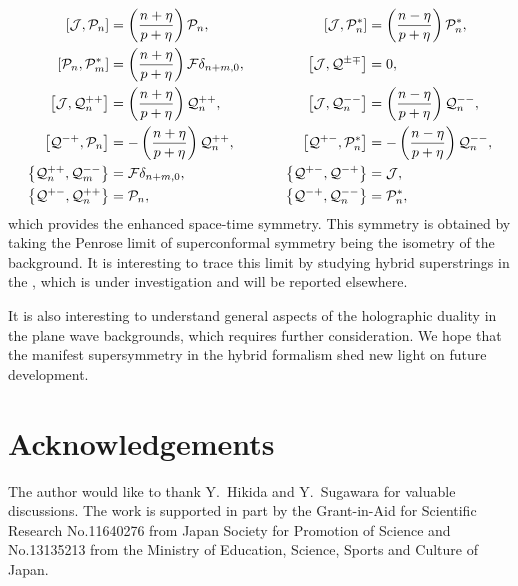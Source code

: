 \documentclass[a4paper,seceq,preprint]{ptptex}
\begin{document}
\begin{alignat}{2}
\left[{\cal J},{\cal P}_n\right]
&=\left(\frac{n+\eta}{p+\eta}\right){\cal P}_n,&\qquad
\left[{\cal J},{\cal P}^*_n\right]
&=\left(\frac{n-\eta}{p+\eta}\right){\cal P}^*_n,\nonumber\\
 \left[{\cal P}_n,{\cal P}^*_m\right]
&=\left(\frac{n+\eta}{p+\eta}\right){\cal F}\delta_{n+m,0},&\qquad
\left[{\cal J},{\cal Q}^{\pm\mp}\right]&=0,
\nonumber\\
\left[{\cal J},{\cal Q}^{++}_n\right]
&=\left(\frac{n+\eta}{p+\eta}\right){\cal Q}^{++}_n,&\qquad
\left[{\cal J},{\cal Q}^{--}_n\right]
&=\left(\frac{n-\eta}{p+\eta}\right){\cal Q}^{--}_n,\nonumber\\
\left[{\cal Q}^{-+},{\cal P}_n\right]
&=-\left(\frac{n+\eta}{p+\eta}\right){\cal Q}^{++}_n,&\qquad
\left[{\cal Q}^{+-},{\cal P}^*_n\right]
&=-\left(\frac{n-\eta}{p+\eta}\right){\cal Q}^{--}_n,\nonumber\\
 \left\{{\cal Q}^{++}_n,{\cal Q}^{--}_m\right\}&=
{\cal F}\delta_{n+m,0},&\qquad
 \left\{{\cal Q^{+-}},{\cal Q}^{-+}\right\}&={\cal J},\nonumber\\
\left\{{\cal Q}^{+-},{\cal Q}^{++}_n\right\}&={\cal P}_n,&\qquad
\left\{{\cal Q}^{-+},{\cal Q}^{--}_n\right\}&={\cal P}^*_n,
\end{alignat}
which provides the enhanced space-time symmetry. 
This symmetry is obtained by taking the Penrose limit of 
\coordHE{} superconformal symmetry being the isometry of the
\coordHE{} background.\cite{HS2}
It is interesting to trace this limit by studying
hybrid superstrings in the \coordHE{},
which is under investigation and will be reported elsewhere.\cite{K}

It is also interesting to understand general aspects of 
the holographic duality in the plane wave backgrounds,\cite{HS2,KP} 
which requires further consideration. We hope that the manifest 
supersymmetry in the hybrid formalism shed new light on 
future development.

\section*{Acknowledgements}
The author would like to thank Y.~Hikida and Y.~Sugawara
for valuable discussions. The work is supported in part by 
the Grant-in-Aid for Scientific Research No.11640276
from Japan Society for Promotion of Science and
No.13135213 from the Ministry of Education, Science, 
Sports and Culture of Japan.
\end{document}
